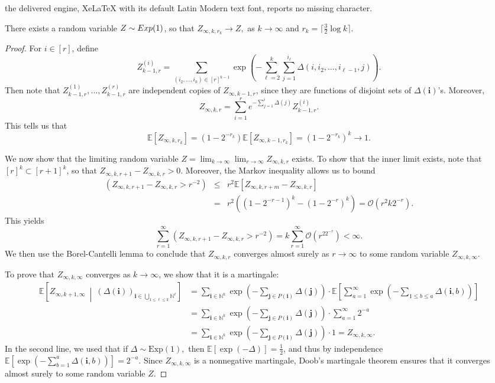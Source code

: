 \documentclass[10pt,a4paper]{amsart}
\newcommand{\E}{\mathbb{E}}
\newcommand{\bigO}{\mathcal{O}}
\providecommand{\P}{}
\begin{document}
the delivered engine, XeLaTeX with its default Latin Modern text font, reports no missing character.
\begin{lemma}\label{lem:exp-limit2}
    There exists a random variable $Z\sim\textup{Exp}(1)$, so that
    \(
    Z_{\infty,k,r_k}\stackrel{\P}\to Z,
    \)
    as $k\to\infty$ and ${r_k=\lceil\frac32\log k\rceil}.$
\end{lemma}

\begin{proof}
For $i \in [r]$, define
\[
Z_{k-1,r}^{(i)}=\sum_{(i_2,\dots,i_k)\in[r]^{k-1}}\exp\left(-\sum_{\ell=2}^k\sum_{j=1}^{i_{\ell}}\Delta(i,i_2,\dots,i_{\ell-1},j)\right).
\]
Then note that $Z_{k-1,r}^{(1)},\dots, Z_{k-1,r}^{(r)}$ are independent copies of $Z_{\infty,k-1,r}$, since they are functions of disjoint sets of $\Delta(\bm i)$'s.
Moreover,
\[
Z_{\infty,k,r}= \sum_{i=1}^r e^{-\sum_{j=1}^i\Delta(j)}Z_{k-1,r}^{(i)}.
\]
This tells us that
\[
\E[Z_{\infty,k,r_k}]=(1-2^{-r_k})\E[Z_{\infty,k-1,r_k}]=(1-2^{-r_k})^k\to1.
\]

We now show that the limiting random variable
\(
Z=\lim_{k\to\infty}\lim_{r\to\infty}Z_{\infty,k,r}
\)
exists. 
To show that the inner limit exists, note that $[r]^k\subset [r+1]^k$, so that $Z_{\infty,k,r+1}-Z_{\infty,k,r}>0$. Moreover, the Markov inequality allows us to bound
\begin{eqnarray*}
\P\left(Z_{\infty,k,r+1}-Z_{\infty,k,r}>r^{-2}\right) &\le& r^2\E[Z_{\infty,k,r+m}-Z_{\infty,k,r}] \\
&=& r^2\left((1-2^{-r-1})^k-(1-2^{-r})^k\right)=\bigO(r^2k2^{-r}).
\end{eqnarray*}
This yields
\[
\sum_{r=1}^\infty\P\left(Z_{\infty,k,r+1}-Z_{\infty,k,r}>r^{-2}\right) = k\sum_{r=1}^\infty \bigO(r^22^{-r}) <\infty.
\]
We then use the Borel-Cantelli lemma to conclude that $Z_{\infty,k,r}$ converges almost surely as $r\to\infty$ to some random variable $Z_{\infty,k,\infty}$. 

To prove that $Z_{\infty,k,\infty}$ converges as $k\to\infty$, we show that it is a martingale:
\begin{align*}
    \E\left[Z_{\infty,k+1,\infty}\ \middle|\ \left(\Delta(\bm{i})\right)_{\bm{i}\in \bigcup_{1 \le\ell\le k}\mathbb{N}^\ell}\right]
    &=\sum_{\bm{i}\in \mathbb{N}^k}\exp\left(-\sum_{\bm{j}\in P(\bm{i})}\Delta(\bm{j})\right)\cdot\E\left[\sum_{a=1}^\infty\exp\left(-\sum_{1 \le b\le a}\Delta(\bm{i},b)\right)\right]\\
    &=\sum_{\bm{i}\in \mathbb{N}^k}\exp\left(-\sum_{\bm{j}\in P(\bm{i})}\Delta(\bm{j})\right)\cdot\sum_{a = 1}^{\infty}2^{-a}\\
    &=\sum_{\bm{i}\in \mathbb{N}^k}\exp\left(-\sum_{\bm{j}\in P(\bm{i})}\Delta(\bm{j})\right)\cdot1=Z_{\infty,k,\infty}.
\end{align*}
In the second line, we used that if $\Delta \sim \text{Exp}(1),$ then $\E[\exp(-\Delta)] = \frac{1}{2}$, and thus by independence $\E\left[\exp\left(-\sum_{b=1}^{a}\Delta(\bm{i}, b) \right)\right] = 2^{-a}$. Since $Z_{\infty,k,\infty}$ is a nonnegative martingale, Doob's martingale theorem ensures that it converges almost surely to some random variable $Z$.


\end{proof}
\end{document}
